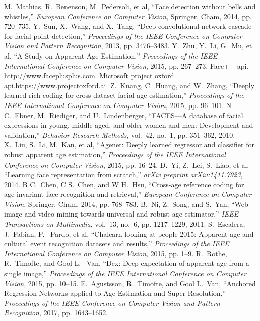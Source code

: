 \documentclass[journal]{IEEEtran}
\begin{document}
\begin{thebibliography}{1}
M.~Mathias, R.~Benenson, M.~Pedersoli, et al, ``Face detection without bells and whistles,'' \emph{European Conference on Computer Vision}, Springer, Cham, 2014, pp. 720--735.
Y.~Sun, X.~Wang, and X.~Tang, ``Deep convolutional network cascade for facial point detection,'' \emph{Proceedings of the IEEE Conference on Computer Vision and Pattern Recognition}, 2013, pp. 3476--3483.
Y.~Zhu, Y.~Li, G.~Mu, et al, ``A Study on Apparent Age Estimation,'' \emph{Proceedings of the IEEE International Conference on Computer Vision}, 2015, pp. 267--273.
Face++ api. http://www.faceplusplus.com.
Microsoft project oxford api.https://www.projectoxford.ai.
Z.~Kuang, C.~Huang, and W.~Zhang, ``Deeply learned rich coding for cross-dataset facial age estimation,'' \emph{Proceedings of the IEEE International Conference on Computer Vision}, 2015, pp. 96--101.
N C.~Ebner, M.~Riediger, and U.~Lindenberger, ``FACES—A database of facial expressions in young, middle-aged, and older women and men: Development and validation,'' \emph{Behavior Research Methods}, vol.~42, no.~1, pp. 351--362, 2010.
X.~Liu, S.~Li, M.~Kan, et al, ``Agenet: Deeply learned regressor and classifier for robust apparent age estimation,'' \emph{Proceedings of the IEEE International Conference on Computer Vision}, 2015, pp. 16--24.
D.~Yi, Z.~Lei, S.~Liao, et al, ``Learning face representation from scratch,'' \emph{arXiv preprint arXiv:1411.7923}, 2014.
B C.~Chen, C S.~Chen, and W H.~Hsu, ``Cross-age reference coding for age-invariant face recognition and retrieval,'' \emph{European Conference on Computer Vision}, Springer, Cham, 2014, pp. 768--783.
B.~Ni, Z.~Song, and S.~Yan, ``Web image and video mining towards universal and robust age estimator,'' \emph{IEEE Transactions on Multimedia}, vol.~13, no.~6, pp. 1217--1229, 2011.
S.~Escalera, J.~Fabian, P.~ Pardo, et al, ``Chalearn looking at people 2015: Apparent age and cultural event recognition datasets and results,'' \emph{Proceedings of the IEEE International Conference on Computer Vision}, 2015, pp. 1--9.
R.~Rothe, R.~Timofte, and Gool L.~ Van, ``Dex: Deep expectation of apparent age from a single image,'' \emph{Proceedings of the IEEE International Conference on Computer Vision}, 2015, pp. 10--15.
E.~Agustsson, R.~Timofte, and Gool L.~Van, ``Anchored Regression Networks applied to Age Estimation and Super Resolution,'' \emph{Proceedings of the IEEE Conference on Computer Vision and Pattern Recognition}, 2017, pp. 1643--1652.

\end{thebibliography}
\end{document}
